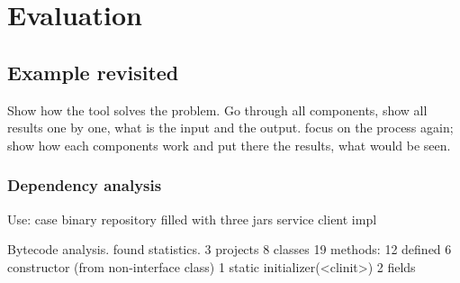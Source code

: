 \chapter{Evaluation}

\section{Example revisited}
Show how the tool solves the problem. Go through all components, show all
results one by one, what is the input and the output.
focus on the process again; show how each components work and put there the results, what would be seen.

\subsection{Dependency analysis}

Use: case binary repository filled with three jars
service
client
impl

Bytecode analysis. found statistics.
3  projects
8  classes
19 methods: 
   12 defined
   6 constructor (from non-interface class)
   1 static initializer(<clinit>)
2  fields


